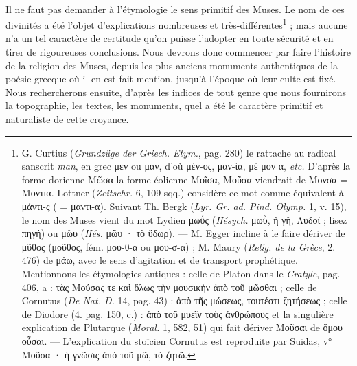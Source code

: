 \documentclass[landscape, a4paper, 11pt, oneside, polutonikogreek, french]{article}
\begin{document}
\paragraph{}
Il ne faut pas demander à l'étymologie le sens primitif des Muses. Le nom de ces divinités a été l'objet d'explications nombreuses et très-différentes\footnote{G. Curtius (\emph{Grundzüge der Griech. Etym.}, pag. 280) le rattache au radical sanscrit \emph{man}, en grec μεν ou μαν, d'où μέν-ος, μαν-ία, μέ μον α, \emph{etc.} D'après la forme dorienne Μῶσα la forme éolienne Μοῖσα, Μοῦσα viendrait de Μονσα = Μοντια. Lottner (\emph{Zeitschr.} 6, 109 sqq.) considère ce mot comme équivalent à μάντι-ς ( = μαντι-α). Suivant Th. Bergk (\emph{Lyr. Gr. ad. Pind. Olymp.} 1, v. 15), le nom des Muses vient du mot Lydien μωΰς (\emph{Hésych.} μωῢ, ἡ γῆ, Λυδοί ; lisez πηγή) ou μῶῡ (\emph{Hés.} μῶῡ · τὸ ὕδωρ). --- M. Egger incline à le faire dériver de μῦθος (μοῦθος, fém. μου-θ-α ou μου-σ-α) ; M. Maury (\emph{Relig. de la Grèce}, 2. 476) de μάω, avec le sens d'agitation et de transport prophétique.\\\hspace*{5mm}Mentionnons les étymologies antiques : celle de Platon dans le \emph{Cratyle}, pag. 406, a : τὰς Μούσας τε καὶ ὅλως τὴν μουσικὴν ἀπὸ τοῦ μῶσθαι ; celle de Cornutus (\emph{De Nat. D.} 14, pag. 43) : ἀπὸ τῆς μώσεως, τουτέστι ζητήσεως ; celle de Diodore (4. pag. 150, c.) : ἀπὸ τοῦ μυεῖν τοὺς ἀνθρώπους et la singulière explication de Plutarque (\emph{Moral.} 1, 582, 51) qui fait dériver Μοῦσαι de ὅμου οὖσαι. --- L'explication du stoïcien Cornutus est reproduite par Suidas, v° Μοῦσα · ἡ γνῶσις ἀπὸ τοῦ μῶ, τὸ ζητῶ.} ; mais aucune n'a un tel caractère de certitude qu'on puisse l'adopter en toute sécurité et en tirer de rigoureuses conclusions. Nous devrons donc commencer par faire l'histoire de la religion des Muses, depuis les plus anciens monuments authentiques de la poésie grecque où il en est fait mention, jusqu'à l'époque où leur culte est fixé. Nous rechercherons ensuite, d'après les indices de tout genre que nous fournirons la topographie, les textes, les monuments, quel a été le caractère primitif et naturaliste de cette croyance.
\end{document}
